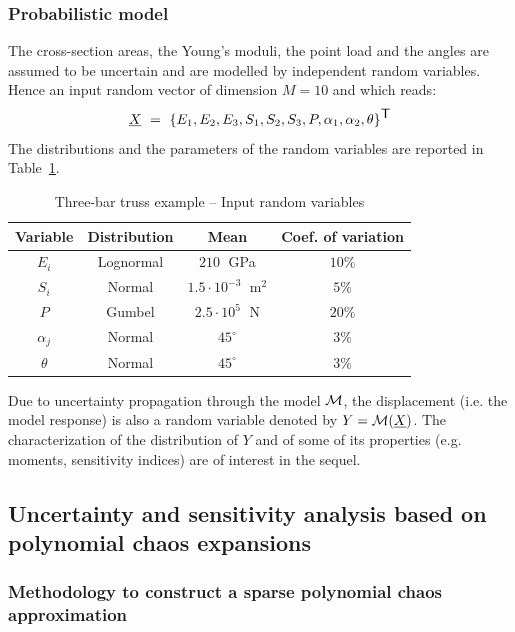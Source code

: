 \documentclass[11pt]{article}
\begin{document}
\subsubsection{Probabilistic model}

The cross-section areas, the Young's moduli, the point load and the angles are assumed to be uncertain and are modelled by independent random variables. Hence an input random vector of dimension $M=10$ and which reads:
\begin{equation}
  \underline{X} \, \, = \, \, \{E_1,E_2,E_3,S_1,S_2,S_3,P,\alpha_1,\alpha_2,\theta\}^{\mbox{\textsf{T}}}
\end{equation}
The distributions and the parameters of the random variables are reported in Table~\ref{table_rvs}.


\begin{table}[Hhbtp]
  \begin{center}
    \begin{tabular}{cccc}
      \hline
      Variable & Distribution & Mean & Coef. of variation \\
      \hline
      $E_i$ &  Lognormal & $210 \;$ GPa& $10\%$ \\
      $S_i$ & Normal & $1.5\cdot 10^{-3}\;$ m$^2$ & $5\%$ \\
      $P$ & Gumbel & $2.5\cdot10^{5}\;$ N& $20\%$ \\
      $\alpha_j$ & Normal & $45^\circ$& $3\%$\\
      $\theta$ & Normal & $45^\circ$& $3\%$   \\
      \hline
    \end{tabular}
    \caption{Three-bar truss example -- Input random variables}
    \label{table_rvs}
  \end{center}

\end{table}

Due to uncertainty propagation through the model ${\mathcal M}$, the displacement (i.e. the model response) is also a random variable denoted by $Y = {\mathcal M}(\underline{X})$. The characterization of the distribution of $Y$ and of some of its properties (e.g. moments, sensitivity indices) are of interest in the sequel.

\subsection{Uncertainty and sensitivity analysis based on polynomial chaos expansions}

\subsubsection{Methodology to construct a sparse polynomial chaos approximation}
\end{document}
